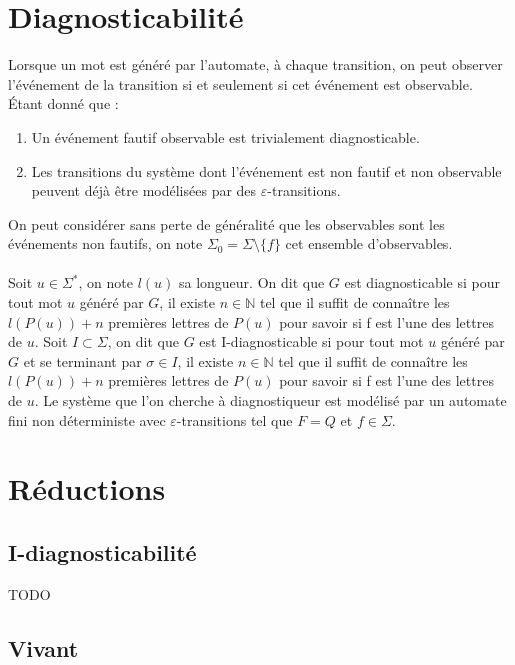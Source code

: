 \documentclass[10pt,a4paper]{article}
\begin{document}
\section{Diagnosticabilit\'e}

Lorsque un mot est généré par l'automate, à chaque transition, on peut observer l’événement de la transition si et seulement si cet événement est observable. Étant donné que :
\begin{enumerate}
\item Un événement fautif observable est trivialement diagnosticable.
\item Les transitions du système dont l'événement est non fautif et non observable peuvent déjà être modélisées par des $\varepsilon$-transitions.
\end{enumerate} 
On peut considérer sans perte de généralité que les observables sont les événements non fautifs, on note $\Sigma_0 = \Sigma \setminus \{f\}$ cet ensemble d'observables.
\paragraph{}
Soit $u \in \Sigma^*$, on note $l(u)$ sa longueur. On dit que $G$ est diagnosticable si pour tout mot $u$ généré par $G$, il existe $n \in \mathbb{N}$ tel que il suffit de connaître les $l(P(u)) + n$ premières lettres de $P(u)$ pour savoir si f est l'une des lettres de $u$. Soit $I \subset \Sigma$, on dit que $G$ est I-diagnosticable si pour tout mot $u$ généré par $G$ et se terminant par $\sigma \in I$, il existe $n \in \mathbb{N}$ tel que il suffit de connaître les $l(P(u)) + n$ premières lettres de $P(u)$ pour savoir si f est l'une des lettres de $u$.
Le système que l'on cherche à diagnostiqueur est modélisé par un automate fini non d\'eterministe avec $\varepsilon$-transitions tel que $F=Q$ et $f\in \Sigma$.


\section{R\'eductions}

\subsection{I-diagnosticabilit\'e}

TODO

\subsection{Vivant}
\end{document}

